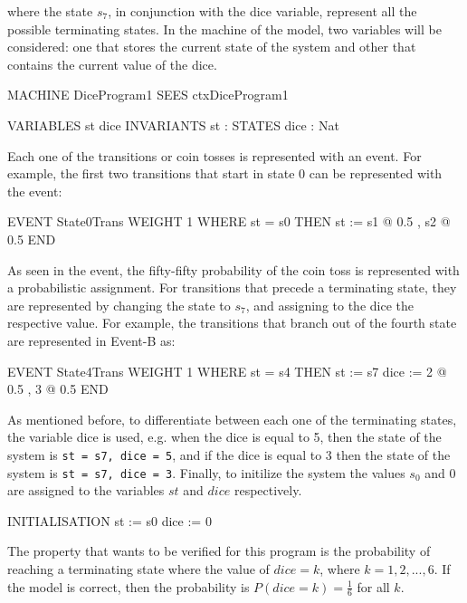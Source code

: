 where the state $s_7$, in conjunction with the dice variable, represent all the possible terminating states. In the machine of the model, two variables will be considered: one that stores the current state of the system and other that contains the current value of the dice.
\begin{maude}

MACHINE DiceProgram1
  SEES ctxDiceProgram1
  
  VARIABLES
    st 
    dice 
  INVARIANTS
    st : STATES
    dice : Nat 
\end{maude}
Each one of the transitions or coin tosses is represented with an event. For example, the first two transitions that start in state 0 can be represented with the event:
\begin{maude}

EVENT State0Trans 
WEIGHT 1
WHERE 
    st = s0
THEN
    st := {s1 @ 0.5 , s2 @ 0.5 }
END
\end{maude}
As seen in the event, the fifty-fifty probability of the coin toss is represented with a probabilistic assignment. For transitions that precede a terminating state, they are represented by changing the state to $s_7$, and assigning to the dice the respective value. For example, the transitions that branch out of the fourth state are represented in Event-B as:
\begin{maude}

EVENT State4Trans 
WEIGHT 1
WHERE 
    st = s4
THEN
    st := s7
    dice := {2 @ 0.5 , 3 @ 0.5 }
END    
\end{maude}
As mentioned before, to differentiate between each one of the terminating states, the variable dice is used, e.g. when the dice is equal to 5, then the state of the system is \texttt{st = s7, dice = 5}, and if the dice is equal to 3 then the state of the system is \texttt{st = s7, dice = 3}. Finally, to initilize the system the values $s_0$ and 0 are assigned to the variables $st$ and $dice$ respectively.
\begin{maude}

INITIALISATION
    st := s0
    dice := 0
\end{maude}


The property that wants to be verified for this program is the probability of reaching a terminating state where the value of $dice = k$, where $k = 1,2,...,6$. If the model is correct, then the probability is $P(dice = k) = \frac{1}{6}$ for all $k$.

